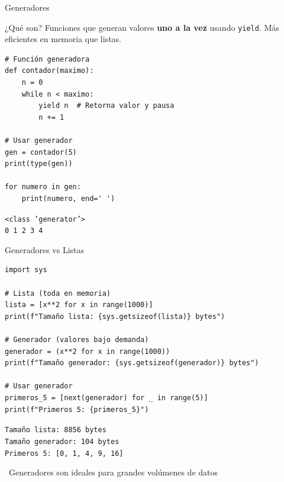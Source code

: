 \documentclass{beamer}
\begin{document}
\begin{frame}[fragile]{Generadores \faRecycle}
\begin{conceptbox}{¿Qué son?}
Funciones que generan valores \textbf{uno a la vez} usando \texttt{yield}. Más eficientes en memoria que listas.
\end{conceptbox}

\begin{lstlisting}
# Función generadora
def contador(maximo):
    n = 0
    while n < maximo:
        yield n  # Retorna valor y pausa
        n += 1

# Usar generador
gen = contador(5)
print(type(gen))

for numero in gen:
    print(numero, end=' ')
\end{lstlisting}

\vspace{-0.2cm}
\begin{tcolorbox}[colback=green!10,colframe=green,title={\small\faArrowCircleRight \ Salida},coltitle=fg0,left=3pt,right=3pt,top=2pt,bottom=2pt,boxsep=1pt]
\small\texttt{<class 'generator'>\\
0 1 2 3 4}
\end{tcolorbox}
\end{frame}

\begin{frame}[fragile]{Generadores vs Listas \faBalanceScale}
\begin{lstlisting}
import sys

# Lista (toda en memoria)
lista = [x**2 for x in range(1000)]
print(f"Tamaño lista: {sys.getsizeof(lista)} bytes")

# Generador (valores bajo demanda)
generador = (x**2 for x in range(1000))
print(f"Tamaño generador: {sys.getsizeof(generador)} bytes")

# Usar generador
primeros_5 = [next(generador) for _ in range(5)]
print(f"Primeros 5: {primeros_5}")
\end{lstlisting}

\vspace{-0.2cm}
\begin{tcolorbox}[colback=green!10,colframe=green,title={\small\faArrowCircleRight \ Salida},coltitle=fg0,left=3pt,right=3pt,top=2pt,bottom=2pt,boxsep=1pt]
\small\texttt{Tamaño lista: 8856 bytes\\
Tamaño generador: 104 bytes\\
Primeros 5: [0, 1, 4, 9, 16]}
\end{tcolorbox}

\vspace{-0.1cm}
\begin{notebox}
\small\faLightbulb\ Generadores son ideales para grandes volúmenes de datos
\end{notebox}
\end{frame}
\end{document}
